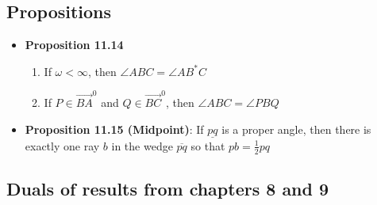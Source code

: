 \documentclass{report}
\begin{document}
    \pagebreak 
    \subsection{Propositions}
    \begin{itemize}
        \item \textbf{Proposition 11.14}
            \begin{enumerate}[label=(\alph*)]
                \item If $\omega < \infty$, then $\angle ABC = \angle AB^{*}C$
                \item If $P \in \overrightarrow{BA}^{0} $ and $Q \in \overrightarrow{BC}^{0} $, then $\angle ABC = \angle PBQ$
                    \bigbreak \noindent 
            \end{enumerate}
        \item \textbf{Proposition 11.15 (Midpoint)}: If $\underline{pq}$ is a proper angle, then there is exactly one ray $b$ in the wedge $\overline{pq}$ so that $pb  = \frac{1}{2}pq $
      
    \end{itemize}



    \pagebreak 
    \subsection{Duals of results from chapters 8 and 9}
    \bigbreak \noindent 
\end{document}
